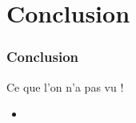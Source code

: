\section{Conclusion}

\begin{frame}
  \frametitle{Conclusion}

  \begin{block}{Ce que l'on n'a pas vu !}
    \begin{itemize}
      \item
    \end{itemize}
  \end{block}
\end{frame}
